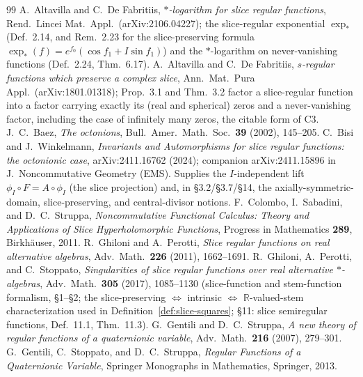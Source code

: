 \documentclass[11pt]{article}
\newcommand{\RR}{\mathbb{R}}
\theoremstyle{plain}
\theoremstyle{definition}
\theoremstyle{remark}
\begin{document}
\begin{thebibliography}{99}
 A.~Altavilla and C.~De Fabritiis, \emph{$\ast$-logarithm for slice regular
functions}, Rend.\ Lincei Mat.\ Appl.\ (arXiv:2106.04227); the slice-regular exponential
$\exp_{*}$ (Def.~2.14, and Rem.~2.23 for the slice-preserving formula
$\exp_{*}(f)=e^{f_0}(\cos f_1+I\sin f_1)$) and the $\ast$-logarithm on never-vanishing
functions (Def.~2.24, Thm.~6.17).
 A.~Altavilla and C.~De Fabritiis, \emph{$s$-regular functions which
preserve a complex slice}, Ann.\ Mat.\ Pura Appl.\ (arXiv:1801.01318); Prop.~3.1 and
Thm.~3.2 factor a slice-regular function into a factor carrying exactly its (real and
spherical) zeros and a never-vanishing factor, including the case of infinitely many zeros,
the citable form of C3.
 J.~C.~Baez, \emph{The octonions}, Bull.\ Amer.\ Math.\ Soc.\
\textbf{39} (2002), 145--205.
 C.~Bisi and J.~Winkelmann, \emph{Invariants and Automorphisms for slice
regular functions: the octonionic case}, arXiv:2411.16762 (2024); companion arXiv:2411.15896 in
J.~Noncommutative Geometry (EMS). Supplies the $I$-independent lift $\phi_I\circ F=A\circ\phi_I$
(the slice projection) and, in \S3.2/\S3.7/\S14, the axially-symmetric-domain, slice-preserving, and
central-divisor notions.
 F.~Colombo, I.~Sabadini, and D.~C.~Struppa, \emph{Noncommutative
Functional Calculus: Theory and Applications of Slice Hyperholomorphic Functions},
Progress in Mathematics \textbf{289}, Birkh\"auser, 2011.
 R.~Ghiloni and A.~Perotti, \emph{Slice regular functions on real
alternative algebras}, Adv.\ Math.\ \textbf{226} (2011), 1662--1691.
\bibitem{SeriesExp} R.~Ghiloni, A.~Perotti, and C.~Stoppato, \emph{Singularities of slice regular
functions over real alternative $\ast$-algebras}, Adv.\ Math.\ \textbf{305} (2017), 1085--1130
(slice-function and stem-function formalism, \S1--\S2; the slice-preserving
$\Leftrightarrow$ intrinsic $\Leftrightarrow$ $\RR$-valued-stem characterization used in
Definition~\ref{def:slice-squares}; \S11: slice semiregular functions, Def.~11.1, Thm.~11.3).
\bibitem{GS07} G.~Gentili and D.~C.~Struppa, \emph{A new theory of regular functions
of a quaternionic variable}, Adv.\ Math.\ \textbf{216} (2007), 279--301.
\bibitem{GSS13} G.~Gentili, C.~Stoppato, and D.~C.~Struppa, \emph{Regular Functions of
a Quaternionic Variable}, Springer Monographs in Mathematics, Springer, 2013.

\end{thebibliography}
\end{document}
